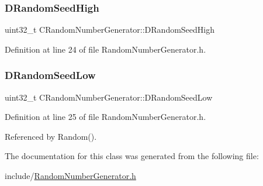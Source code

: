 \subsubsection{\texorpdfstring{D\+Random\+Seed\+High}{DRandomSeedHigh}}
{\footnotesize\ttfamily uint32\+\_\+t C\+Random\+Number\+Generator\+::\+D\+Random\+Seed\+High\hspace{0.3cm}{\ttfamily [protected]}}



Definition at line 24 of file Random\+Number\+Generator.\+h.

\hypertarget{classCRandomNumberGenerator_a33bf3bb9bc1378f4142932a01a3e2cfd}{}\label{classCRandomNumberGenerator_a33bf3bb9bc1378f4142932a01a3e2cfd} 
\subsubsection{\texorpdfstring{D\+Random\+Seed\+Low}{DRandomSeedLow}}
{\footnotesize\ttfamily uint32\+\_\+t C\+Random\+Number\+Generator\+::\+D\+Random\+Seed\+Low\hspace{0.3cm}{\ttfamily [protected]}}



Definition at line 25 of file Random\+Number\+Generator.\+h.



Referenced by Random().



The documentation for this class was generated from the following file\+:\begin{DoxyCompactItemize}
\item 
include/\hyperlink{RandomNumberGenerator_8h}{Random\+Number\+Generator.\+h}\end{DoxyCompactItemize}
